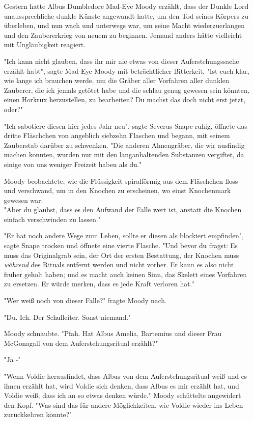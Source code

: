 {Gestern hatte Albus Dumbledore Mad-Eye Moody erzählt, dass der Dunkle Lord unaussprechliche dunkle Künste angewandt hatte, um den Tod seines Körpers zu überleben, und nun wach und unterwegs war, um seine Macht wiederzuerlangen und den Zaubererkrieg von neuem zu beginnen. Jemand anders hätte vielleicht mit Ungläubigkeit reagiert.

"Ich kann nicht glauben, dass ihr mir nie etwas von dieser Auferstehungssache erzählt habt", sagte Mad-Eye Moody mit beträchtlicher Bitterkeit. "Ist euch klar, wie lange ich brauchen werde, um die Gräber aller Vorfahren aller dunklen Zauberer, die ich jemals getötet habe und die schlau genug gewesen sein könnten, einen Horkrux herzustellen, zu bearbeiten? Du machst das doch nicht erst jetzt, oder?"

"Ich sabotiere diesen hier jedes Jahr neu", sagte Severus Snape ruhig, öffnete das dritte Fläschchen von angeblich siebzehn Flaschen und begann, mit seinem Zauberstab darüber zu schwenken. "Die anderen Ahnengräber, die wir ausfindig machen konnten, wurden nur mit den langanhaltenden Substanzen vergiftet, da einige von uns weniger Freizeit haben als du."

Moody beobachtete, wie die Flüssigkeit spiralförmig aus dem Fläschchen floss und verschwand, um in den Knochen zu erscheinen, wo einst Knochenmark gewesen war.\\ "Aber du glaubst, dass es den Aufwand der Falle wert ist, anstatt die Knochen einfach verschwinden zu lassen."

"Er hat noch andere Wege zum Leben, sollte er diesen als blockiert empfinden", sagte Snape trocken und öffnete eine vierte Flasche. "Und bevor du fragst: Es muss das Originalgrab sein, der Ort der ersten Bestattung, der Knochen muss \emph{während} des Rituals entfernt werden und nicht vorher. Er kann es also nicht früher geholt haben; und es macht auch keinen Sinn, das Skelett eines Vorfahren zu ersetzen. Er würde merken, dass es jede Kraft verloren hat."

"Wer weiß noch von dieser Falle?" fragte Moody nach.

"Du. Ich. Der Schulleiter. Sonst niemand."

Moody schnaubte. "Pfah. Hat Albus Amelia, Bartemius und dieser Frau McGonagall von dem Auferstehungsritual erzählt?"

"Ja -"

"Wenn Voldie herausfindet, dass Albus von dem Auferstehungsritual weiß und es ihnen erzählt hat, wird Voldie sich denken, dass Albus es mir erzählt hat, und Voldie weiß, dass ich an so etwas denken würde." Moody schüttelte angewidert den Kopf. "Was sind das für andere Möglichkeiten, wie Voldie wieder ins Leben zurückkehren könnte?"

}
